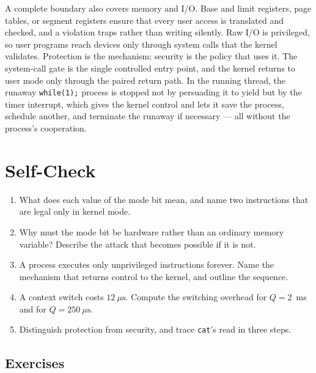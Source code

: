 \documentclass[11pt]{article}
\begin{document}
A complete boundary also covers memory and I/O. Base and limit registers, page
tables, or segment registers ensure that every user access is translated and
checked, and a violation traps rather than writing silently. Raw I/O is
privileged, so user programs reach devices only through system calls that the
kernel validates. Protection is the mechanism; security is the policy that uses
it. The system-call gate is the single controlled entry point, and the kernel
returns to user mode only through the paired return path. In the running
thread, the runaway \texttt{while(1);} process is stopped not by persuading it
to yield but by the timer interrupt, which gives the kernel control and lets it
save the process, schedule another, and terminate the runaway if necessary ---
all without the process's cooperation.

\section*{Self-Check}

\begin{enumerate}
  \item What does each value of the mode bit mean, and name two instructions
    that are legal only in kernel mode.
  \item Why must the mode bit be hardware rather than an ordinary memory
    variable? Describe the attack that becomes possible if it is not.
  \item A process executes only unprivileged instructions forever. Name the
    mechanism that returns control to the kernel, and outline the sequence.
  \item A context switch costs $12\ \mu\text{s}$. Compute the switching
    overhead for $Q=2$~ms and for $Q=250\ \mu\text{s}$.
  \item Distinguish protection from security, and trace \texttt{cat}'s read in
    three steps.
\end{enumerate}

\subsection*{Exercises}
\end{document}
